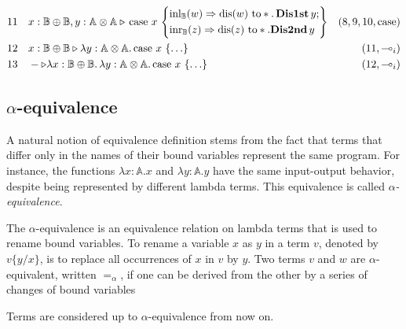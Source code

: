 \begin{example}
\begin{equation*}
\begin{split}
11 \hspace{10 pt} &    x: \mathbb{\mathbb{B} \oplus \mathbb{B}},  y: \mathbb{A \otimes A} \triangleright \, 
\text{case } x \,  
  \left\{
    \begin{aligned} 
    &\mathrm{inl}_{\mathbb{B}}(w) \Rightarrow \text{dis}(w) \text{ to} * . \, \textbf{Dis1st} \, y; \\
    &\mathrm{inr}_{\mathbb{B}}(z) \Rightarrow  \text{dis}(z) \text{ to} *. \textbf{Dis2nd} \, y   \\ 
  \end{aligned}  
  \right\}  & \text{($8,9,10,\text{case}$)} \\
12 \hspace{10 pt} & x: \mathbb{\mathbb{B} \oplus \mathbb{B}} \triangleright \lambda y: \mathbb{A \otimes A}. \, 
\text{case } x \,  
  \left\{ \ldots 
  \right\}   & \text{($11,\multimap_i$)} \\
13 \hspace{10 pt} & - \triangleright  \lambda x: \mathbb{\mathbb{B} \oplus \mathbb{B}}. \, \lambda y: \mathbb{A \otimes A}. \, 
\text{case } x \,  
  \left\{ \ldots  
  \right\}   & \text{($12,\multimap_i$)}
\end{split}
\end{equation*}
\end{example}


\subsection{$\alpha$-equivalence}
 
A natural notion of equivalence definition stems from the fact that terms that differ only in the names of their bound variables represent the same program. For instance, the functions $\lambda x:\mathbb{A}.x $ and $\lambda y:\mathbb{A}.y$ have the same input-output behavior, despite being represented by different lambda terms. This equivalence is called $\alpha$\emph{-equivalence}.

\begin{definition}
  The $\alpha$-equivalence is an equivalence relation on lambda terms that is used to rename bound variables. To rename a variable $x$ as $y$ in a term $v$, denoted by $v\{y/x\}$, is to replace all occurrences of $x$ in $v$ by $y$. Two terms $v$ and $w$ are $\alpha$-equivalent, written $=_{\alpha}$, if one can be derived from the other by a series of
  changes of bound variables
\end{definition}

\begin{convention}
  Terms are considered up to $\alpha$-equivalence from now on.
\end{convention}

